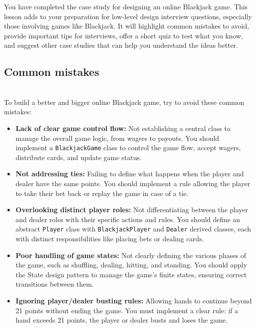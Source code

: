 

You have completed the case study for designing an online Blackjack game. This lesson adds to your preparation for low-level design interview questions, especially those involving games like Blackjack. It will highlight common mistakes to avoid, provide important tips for interviews, offer a short quiz to test what you know, and suggest other case studies that can help you understand the ideas better.

\subsection{Common mistakes}\label{lzEVpKDWS5DGTyrwz_ylV}
\\
To build a better and bigger online Blackjack game, try to avoid these common mistakes:

\begin{itemize}
\item
\protect{}\label{_tLiyGUCfH-2KaCr9VKgS}
\textbf{Lack of clear game control flow:} Not establishing a central class to manage the overall game logic, from wagers to payouts. You should implement a \texttt{BlackjackGame} class to control the game flow, accept wagers, distribute cards, and update game status.
\item
\protect{}\label{AY-V3VvMc4plqA3twjzxq}
\textbf{Not addressing ties:} Failing to define what happens when the player and dealer have the same points. You should implement a rule allowing the player to take their bet back or replay the game in case of a tie.
\item
\protect{}\label{mPbRd1z3lCp9TOGazfrPS}
\textbf{Overlooking distinct player roles:} Not differentiating between the player and dealer roles with their specific actions and rules. You should define an abstract \texttt{Player} class with \texttt{BlackjackPlayer} and \texttt{Dealer} derived classes, each with distinct responsibilities like placing bets or dealing cards.
\item
\protect{}\label{j5_oRRwHKNiTD4HhtKhNC}
\textbf{Poor handling of game states:} Not clearly defining the various phases of the game, such as shuffling, dealing, hitting, and standing. You should apply the State design pattern to manage the game's finite states, ensuring correct transitions between them.
\item
\protect{}\label{2U5xfvo34NkHivhqcayvy}
\textbf{Ignoring player/dealer busting rules:} Allowing hands to continue beyond 21 points without ending the game. You must implement a clear rule: if a hand exceeds 21 points, the player or dealer busts and loses the game.
\end{itemize}

